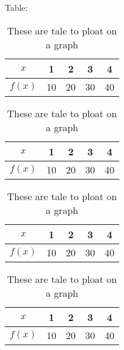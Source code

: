 \documentclass{article}
\begin{document}
Table:\\
\begin{table}[H]
\centering
\begin{tabular}{|c||c|c|c|c|}
\hline
$x$ & 1 & 2 & 3 & 4 \\ \hline
$f(x)$ & 10 & 20 & 30 &40\\ \hline

\end{tabular}

\caption{These are tale to ploat on a graph}
\vspace{1cm}

\begin{tabular}{|c||c|c|c|c|}
\hline
$x$ & 1 & 2 & 3 & 4 \\ \hline
$f(x)$ & 10 & 20 & 30 &40\\ \hline

\end{tabular}

\caption{These are tale to ploat on a graph}
\vspace{1cm}

\begin{tabular}{|c||c|c|c|c|}
\hline
$x$ & 1 & 2 & 3 & 4 \\ \hline
$f(x)$ & 10 & 20 & 30 &40\\ \hline

\end{tabular}

\caption{These are tale to ploat on a graph}
\hspace{1cm}
\begin{tabular}{|c||c|c|c|c|}
\hline
$x$ & 1 & 2 & 3 & 4 \\ \hline
$f(x)$ & 10 & 20 & 30 &40\\ \hline

\end{tabular}
\caption{These are tale to ploat on a graph}
\end{table}
\end{document}
